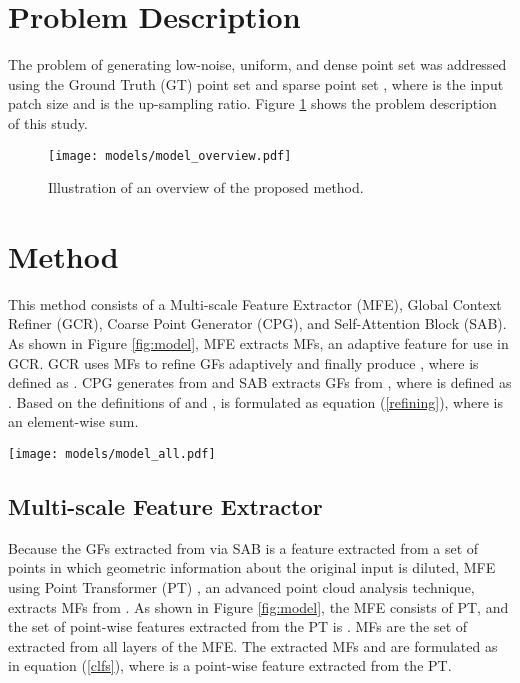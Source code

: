 \documentclass{article}
\begin{document}
\section{Problem Description}
\label{sec:problem_description}
\quad The problem of generating low-noise, uniform, and dense point set  was addressed using the Ground Truth (GT) point set  and sparse point set , where  is the input patch size and  is the up-sampling ratio. Figure \ref{fig:overview} shows the problem description of this study.


\begin{figure}[htb!]
  \centering  \texttt{[image: models/model\_overview.pdf]}
  \caption{Illustration of an overview of the proposed method.}
  \label{fig:overview}
\end{figure}

\section{Method}
\label{sec:method}
\quad This method consists of a Multi-scale Feature Extractor (MFE), Global Context Refiner (GCR), Coarse Point Generator (CPG), and Self-Attention Block (SAB). As shown in Figure \ref{fig:model}, MFE extracts MFs, an adaptive feature for use in GCR. GCR uses MFs to refine GFs adaptively and finally produce , where  is defined as . CPG generates  from  and SAB extracts GFs from , where  is defined as . Based on the definitions of  and ,  is formulated as equation (\ref{refining}), where  is an element-wise sum.
\begin{center}

\end{center}

\begin{figure*}[htb!]
  \centering
  \texttt{[image: models/model\_all.pdf]}
  \caption{Illustration of the proposed framework. Here, 3 is the coordinate dimension, and  is the depth of the layer. In Multi-scale Feature Extractor (MFE) and Global Context Refiner (GCR),  is the channel, and  is the expansion ratio. In Coarse Point Generator (CPG) and Self-Attention Block (SAB),  is the channel and  is the expansion ratio.}
  \label{fig:model}
\end{figure*}

\subsection{Multi-scale Feature Extractor}
\label{sec:cascade_local_feature_extractor}
\quad Because the GFs extracted from  via SAB is a feature extracted from a set of points in which geometric information about the original input  is diluted, MFE using Point Transformer (PT) \cite{zhao2021point}, an advanced point cloud analysis technique, extracts MFs from . As shown in Figure \ref{fig:model}, the MFE consists of  PT, and the set of point-wise features extracted from the  PT is . MFs are the set of  extracted from all layers of the MFE. The extracted MFs and  are formulated as in equation (\ref{clfs}), where  is a point-wise feature extracted from the  PT.
\end{document}
